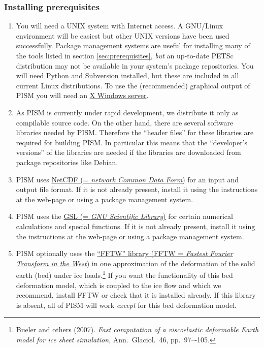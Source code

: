 \documentclass[11pt,final]{amsart}
\begin{document}
\subsubsection{Installing prerequisites}
\renewcommand{\labelenumi}{\textbf{\arabic{enumi}.}~}
\begin{enumerate}
\item You will need a UNIX system with Internet access. A GNU/Linux environment will be easiest but other UNIX versions have been
  used successfully. Package management systems are useful for installing many of the tools listed in section
  \ref{sec:prerequisites}, \emph{but} an up-to-date PETSc distribution may not be available in your system's package
  repositories. You will need \href{http://www.python.org/}{Python} and \href{http://subversion.tigris.org/}{Subversion}
  installed, but these are included in all current Linux distributions. To use the (recommended) graphical output of PISM you will
  need an \href{http://www.x.org/}{X Windows server}.

\item As PISM is currently under rapid development, we distribute it only as compilable source code. On the other hand, there are
  several software libraries needed by PISM. Therefore the ``header files'' for these libraries are required for building PISM. In
  particular this means that the ``developer's versions'' of the libraries are needed if the libraries are downloaded from package
  repositories like Debian.

\item PISM uses \href{http://www.unidata.ucar.edu/software/netcdf/}{NetCDF (= \emph{network Common Data Form})} for
  an input and output file format. If it is not already present, install it using the instructions at the web-page or using a
  package management system.

\item PISM uses the \href{http://www.gnu.org/software/gsl/}{GSL (= \emph{GNU Scientific Library})} for certain numerical calculations and special functions. If it is not already present, install it using the
  instructions at the web-page or using a package management system.

\item PISM optionally uses the \href{http://www.fftw.org/}{``FFTW'' library (FFTW = \emph{Fastest Fourier Transform in the
      West})} in one approximation of the deformation of the solid earth (bed) under
  ice loads.\footnote{Bueler and others (2007). \emph{Fast computation of a viscoelastic deformable Earth model for ice sheet simulation}, Ann.~Glaciol.~46, pp.~97–-105.}  If you want the functionality of this bed deformation model, which is coupled to the ice flow and which we
  recommend, install FFTW or check that it is installed already. If this library is absent, all of PISM will work
  \emph{except} for this bed deformation model.


\end{enumerate}
\end{document}
